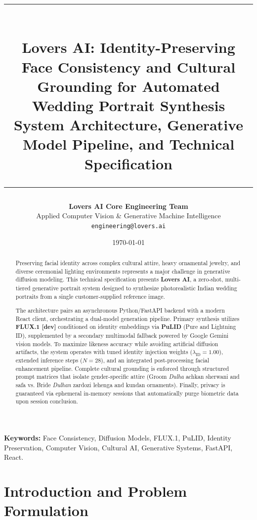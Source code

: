 \documentclass[11pt,a4paper]{article}
\title{
    \vspace{-1.5cm}
    \rule{\linewidth}{1.2pt} \\[0.4cm]
    \LARGE \textbf{Lovers AI: Identity-Preserving Face Consistency and Cultural Grounding for Automated Wedding Portrait Synthesis} \\[0.2cm]
    \large System Architecture, Generative Model Pipeline, and Technical Specification \\
    \rule{\linewidth}{0.6pt}
}
\author{
    \textbf{Lovers AI Core Engineering Team} \\
    \normalsize Applied Computer Vision \& Generative Machine Intelligence \\
    \normalsize \texttt{engineering@lovers.ai}
}
\date{\today}
\begin{document}
\maketitle
\thispagestyle{fancy}

\begin{abstract}
Preserving facial identity across complex cultural attire, heavy ornamental jewelry, and diverse ceremonial lighting environments represents a major challenge in generative diffusion modeling. This technical specification presents \textbf{Lovers AI}, a zero-shot, multi-tiered generative portrait system designed to synthesize photorealistic Indian wedding portraits from a single customer-supplied reference image. 

The architecture pairs an asynchronous Python/FastAPI backend with a modern React client, orchestrating a dual-model generation pipeline. Primary synthesis utilizes \textbf{FLUX.1 [dev]} conditioned on identity embeddings via \textbf{PuLID} (Pure and Lightning ID), supplemented by a secondary multimodal fallback powered by Google Gemini vision models. To maximize likeness accuracy while avoiding artificial diffusion artifacts, the system operates with tuned identity injection weights ($\lambda_{\text{ID}} = 1.00$), extended inference steps ($N = 28$), and an integrated post-processing facial enhancement pipeline. Complete cultural grounding is enforced through structured prompt matrices that isolate gender-specific attire (Groom \textit{Dulha} achkan sherwani and safa vs. Bride \textit{Dulhan} zardozi lehenga and kundan ornaments). Finally, privacy is guaranteed via ephemeral in-memory sessions that automatically purge biometric data upon session conclusion.
\end{abstract}

\vspace{0.2cm}
\noindent\textbf{Keywords:} Face Consistency, Diffusion Models, FLUX.1, PuLID, Identity Preservation, Computer Vision, Cultural AI, Generative Systems, FastAPI, React.

\vspace{0.3cm}
\tableofcontents
\newpage

\section{Introduction and Problem Formulation}
\end{document}
